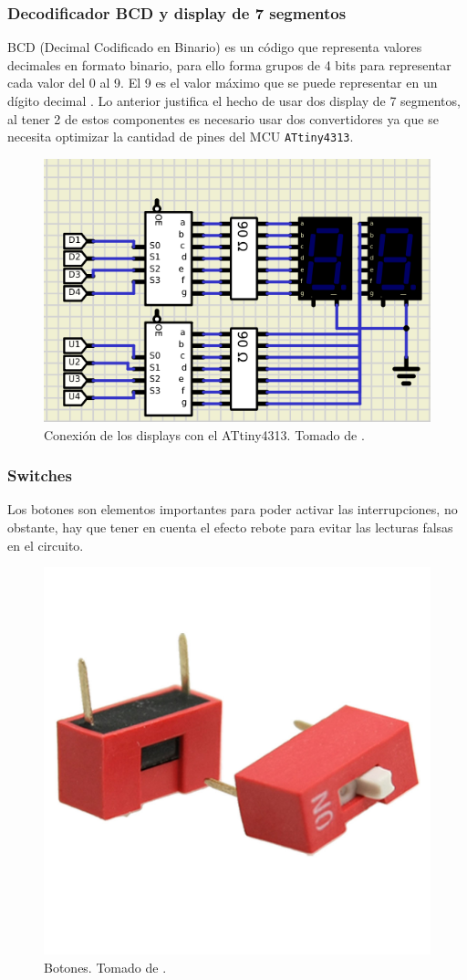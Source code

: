 \subsubsection*{Decodificador BCD y display de 7 segmentos}
BCD (Decimal Codificado en Binario) es un código que representa valores decimales en formato binario, para ello forma grupos de 4 bits para representar cada valor del 0 al 9. El 9 es el valor máximo que se puede representar en un dígito decimal \cite{web2}. Lo anterior justifica el hecho de usar dos display de 7 segmentos, al tener 2 de estos componentes es necesario usar dos convertidores ya que se necesita optimizar la cantidad de pines del MCU \texttt{ATtiny4313}.
    \begin{figure}[H]
        \centering
        \includegraphics[width=.5\linewidth]{Imagenes/4.png}
        \caption{Conexión de los displays con el ATtiny4313. Tomado de \cite{web}.}
        \label{fig10}
    \end{figure}
\subsubsection*{Switches}
Los botones son elementos importantes para poder activar las interrupciones, no obstante, hay que tener en cuenta el efecto rebote para evitar las lecturas falsas en el circuito.
    \begin{figure}[H]
        \centering
        \includegraphics[width=.3\linewidth]{Imagenes/switch.jpeg}
        \caption{Botones. Tomado de \cite{web3}.}
        \label{boton}
    \end{figure}


